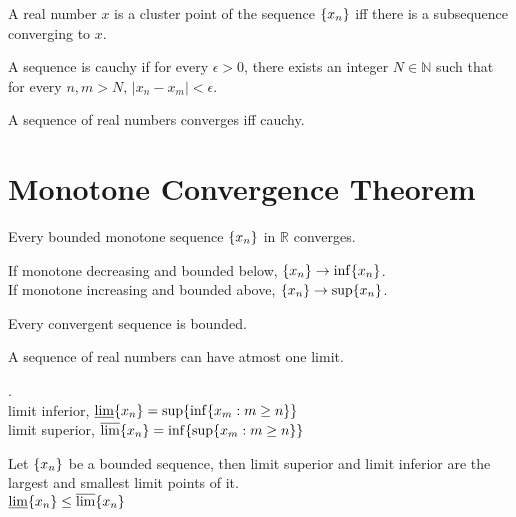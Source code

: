 	\begin{remark}
		A real number $x$ is a cluster point of the sequence $\{x_n\}$ iff there is a subsequence converging to $x$.
	\end{remark}
	

	\begin{definition}[cauchy]
		A sequence is cauchy if for every $\epsilon > 0$, there exists an integer $N \in \mathbb{N}$ such that for every $n,m > N$, $|x_n-x_m| < \epsilon$.
	\end{definition}

	\begin{remark}
		A sequence of real numbers converges iff cauchy.
	\end{remark}

\section{Monotone Convergence Theorem}
	\begin{theorem}
		Every bounded monotone sequence $\{x_n\}$ in $\mathbb{R}$ converges.
	\end{theorem}
	
	\begin{remark}
		If monotone decreasing and bounded below, $\{x_n\} \to \inf \{x_n\}$.\\
		If monotone increasing and bounded above, $\{x_n\} \to \sup \{x_n\}$.
	\end{remark}

	\begin{remark}
		Every convergent sequence is bounded.
	\end{remark}

	\begin{remark}
		A sequence of real numbers can have atmost one limit.
	\end{remark}

	\begin{definition}.\\
		limit inferior, $\varliminf \{x_n\}= \sup \{\inf \{x_m : m \ge n\} \}$\\
		limit superior, $\varlimsup \{x_n\}= \inf \{\sup \{x_m : m \ge n\} \}$
	\end{definition}

	\begin{remark}
		Let $\{x_n\}$ be a bounded sequence, then limit superior and limit inferior are the largest and smallest limit points of it.\cite{aliprantis}\\
		$\varliminf \{x_n\} \le \varlimsup \{x_n\}$
	\end{remark}

